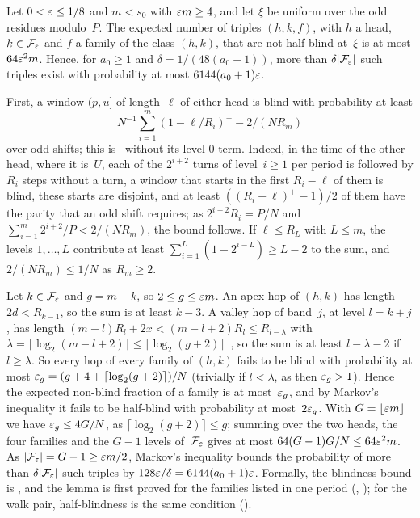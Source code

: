 \begin{lemma}\label{lem:dnp-halfblind}
Let $0<\varepsilon\le1/8$ and $m<s_0$ with $\varepsilon m\ge4$, and let $\xi$ be uniform over the odd residues modulo~$P$. The expected
number of triples $(h,k,f)$, with $h$ a head, $k\in\mathcal F_\varepsilon$ and $f$ a family of the class $(h,k)$, that are not
half-blind at~$\xi$ is at most $64\varepsilon^2m$. Hence, for $a_0\ge1$ and $\delta=1/(48(a_0+1))$, more than
$\delta\lvert \mathcal F_\varepsilon \rvert$ such triples exist with probability at most $6144(a_0+1)\varepsilon$.
\end{lemma}

\begin{outline}
First, a window $(p,u]$ of length~$\ell$ of either head is blind with probability at least
\[
  N^{-1}\sum_{i=1}^m(1-\ell/R_i)^+-2/(NR_m)
\]
over odd shifts; this is~\cite[Proposition~5.17]{BoundedNesting2026} without its level-$0$ term. Indeed, in the time of
the other head, where it is~$U$, each of the $2^{i+2}$ turns of level~$i\ge1$ per period is followed by $R_i$ steps without
a turn, a window that starts in the first $R_i-\ell$ of them is blind, these starts are disjoint, and at least
$((R_i-\ell)^+-1)/2$ of them have the parity that an odd shift requires; as $2^{i+2}R_i=P/N$ and
$\sum_{i=1}^m2^{i+2}/P<2/(NR_m)$, the bound follows. If $\ell\le R_L$ with $L\le m$, the levels $1,\dots,L$ contribute
at least $\sum_{i=1}^L(1-2^{i-L})\ge L-2$ to the sum, and $2/(NR_m)\le1/N$ as $R_m\ge2$.

Let $k\in\mathcal F_\varepsilon$ and $g=m-k$, so $2\le g\le\varepsilon m$. An apex hop of $(h,k)$ has length $2d<R_{k-1}$, so the sum is
at least $k-3$. A valley hop of band~$j$, at level $l=k+j$, has length $(m-l)R_l+2x<(m-l+2)R_l\le R_{l-\lambda}$ with
$\lambda=\lceil\log_2(m-l+2)\rceil\le\lceil\log_2(g+2)\rceil$~\cite[Lemma~5.1(b)]{BoundedNesting2026}, so the sum is at
least $l-\lambda-2$ if $l\ge\lambda$. So every hop of every family of $(h,k)$ fails to be blind with probability at most
$\varepsilon_g=(g+4+\lceil\log_2(g+2)\rceil)/N$ (trivially if $l<\lambda$, as then $\varepsilon_g>1$). Hence the expected non-blind
fraction of a family is at most~$\varepsilon_g$, and by Markov's inequality it fails to be half-blind with probability at
most~$2\varepsilon_g$. With $G=\lfloor\varepsilon m\rfloor$ we have $\varepsilon_g\le4G/N$, as $\lceil\log_2(g+2)\rceil\le g$; summing over the
two heads, the four families and the $G-1$ levels of~$\mathcal F_\varepsilon$ gives at most $64(G-1)G/N\le64\varepsilon^2m$. As
$\lvert \mathcal F_\varepsilon \rvert=G-1\ge\varepsilon m/2$, Markov's inequality bounds the probability of more than
$\delta\lvert \mathcal F_\varepsilon \rvert$ such triples by $128\varepsilon/\delta=6144(a_0+1)\varepsilon$.
Formally, the blindness bound is , and the lemma is first proved for the families
listed in one period (, ); for the walk
pair, half-blindness is the same condition ().
\end{outline}

